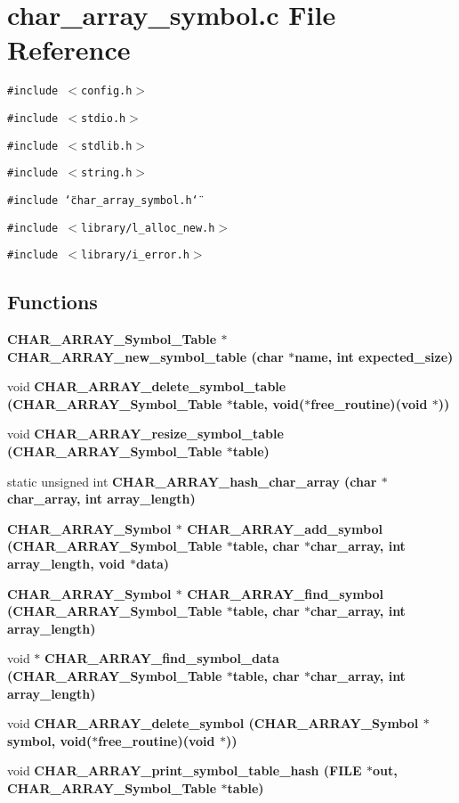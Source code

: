 \section{char\_\-array\_\-symbol.c File Reference}
\label{char__array__symbol_8c}
{\tt \#include $<$config.h$>$}\par
{\tt \#include $<$stdio.h$>$}\par
{\tt \#include $<$stdlib.h$>$}\par
{\tt \#include $<$string.h$>$}\par
{\tt \#include \char`\"{}char\_\-array\_\-symbol.h\char`\"{}}\par
{\tt \#include $<$library/l\_\-alloc\_\-new.h$>$}\par
{\tt \#include $<$library/i\_\-error.h$>$}\par
\subsection*{Functions}
\begin{CompactItemize}
\item 
\bf{CHAR\_\-ARRAY\_\-Symbol\_\-Table} $\ast$ \bf{CHAR\_\-ARRAY\_\-new\_\-symbol\_\-table} (char $\ast$\bf{name}, int expected\_\-size)
\item 
void \bf{CHAR\_\-ARRAY\_\-delete\_\-symbol\_\-table} (\bf{CHAR\_\-ARRAY\_\-Symbol\_\-Table} $\ast$table, void($\ast$free\_\-routine)(void $\ast$))
\item 
void \bf{CHAR\_\-ARRAY\_\-resize\_\-symbol\_\-table} (\bf{CHAR\_\-ARRAY\_\-Symbol\_\-Table} $\ast$table)
\item 
static unsigned int \bf{CHAR\_\-ARRAY\_\-hash\_\-char\_\-array} (char $\ast$char\_\-array, int array\_\-length)
\item 
\bf{CHAR\_\-ARRAY\_\-Symbol} $\ast$ \bf{CHAR\_\-ARRAY\_\-add\_\-symbol} (\bf{CHAR\_\-ARRAY\_\-Symbol\_\-Table} $\ast$table, char $\ast$char\_\-array, int array\_\-length, void $\ast$data)
\item 
\bf{CHAR\_\-ARRAY\_\-Symbol} $\ast$ \bf{CHAR\_\-ARRAY\_\-find\_\-symbol} (\bf{CHAR\_\-ARRAY\_\-Symbol\_\-Table} $\ast$table, char $\ast$char\_\-array, int array\_\-length)
\item 
void $\ast$ \bf{CHAR\_\-ARRAY\_\-find\_\-symbol\_\-data} (\bf{CHAR\_\-ARRAY\_\-Symbol\_\-Table} $\ast$table, char $\ast$char\_\-array, int array\_\-length)
\item 
void \bf{CHAR\_\-ARRAY\_\-delete\_\-symbol} (\bf{CHAR\_\-ARRAY\_\-Symbol} $\ast$symbol, void($\ast$free\_\-routine)(void $\ast$))
\item 
void \bf{CHAR\_\-ARRAY\_\-print\_\-symbol\_\-table\_\-hash} (FILE $\ast$out, \bf{CHAR\_\-ARRAY\_\-Symbol\_\-Table} $\ast$table)
\end{CompactItemize}

